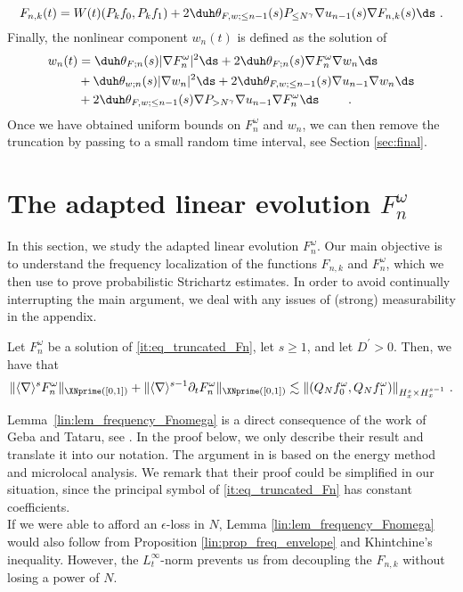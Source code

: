 \documentclass[11pt]{article}
\begin{document}
\begin{equation}
F_{n,k}(t)= W(t) (P_k  f_0, P_k f_1) + 2 \duh \theta_{F,w;\leq n-1}(s) P_{\leq N^\gamma} \nabla u_{n-1}(s) \nabla F_{n,k}(s) \ds~. \label{it:eq_truncated_Fnk}
\end{equation}
Finally, the nonlinear component \( w_{n}(t) \) is defined as the solution of 
\begin{align}
w_n(t) &= \duh  \theta_{F;n}(s) |\nabla F_n^\omega|^2\ds  
		+ 2 \duh \theta_{F;n}(s) \nabla F_n^\omega \nabla w_n \ds   \notag\\
		&+ \duh \theta_{w;n}(s) |\nabla w_n|^2\ds\label{it:eq_truncated_wn}  
		+ 2 \duh \theta_{F,w;\leq n-1}(s) \nabla u_{n-1} \nabla w_n \ds   \\
		&+ 2 \duh \theta_{F,w;\leq n-1}(s) \nabla P_{>N^\gamma} \nabla u_{n-1} \nabla F_n^\omega \ds \qquad~.   \notag
\end{align}
Once we have obtained uniform bounds on \(F_n^\omega \) and \( w_n \), we can then remove the truncation by passing to a small random time interval, see Section \ref{sec:final}.

\section{The adapted linear evolution \(F_n^\omega\)}\label{sec:lin}

In this section, we study the adapted linear evolution \( F_n^\omega \). Our main objective is to understand the frequency localization of the functions \( F_{n,k} \) and \( F_n^\omega \), which we then use to prove probabilistic Strichartz estimates. In order to avoid continually interrupting the main argument, we deal with any issues of (strong) measurability in the appendix.

\begin{lem} \label{lin:lem_frequency_Fnomega}
Let \( F_n^\omega \) be a solution of \eqref{it:eq_truncated_Fn}, let \( s \geq 1 \), and let \( D^\prime >0\). Then, we have that
\begin{equation}\label{lin:eq_frequency_Fnomega}
\| \langle \nabla \rangle^s F_n^\omega \|_{\XNprime([0,1])} + \| \langle \nabla \rangle^{s-1} \partial_t F_n^\omega \|_{\XNprime([0,1])} \lesssim \| (Q_N f_0^\omega, Q_N f_1^\omega ) \|_{H_x^s\times H_x^{s-1}} ~. 
\end{equation}
\end{lem}
\mbox{Lemma  \ref{lin:lem_frequency_Fnomega}} is a direct consequence of the work of Geba and Tataru, see \cite[Proposition 3.1]{TG05}. In the proof below, we only describe their result and translate it into our notation. The argument in \cite{TG05} is based on the energy method and microlocal analysis. We remark that their proof could be simplified in our situation, since the principal symbol of \eqref{it:eq_truncated_Fn} has constant coefficients. \\
If we were able to afford an \(\epsilon\)-loss in \( N\), Lemma \ref{lin:lem_frequency_Fnomega} would also follow from Proposition \ref{lin:prop_freq_envelope} and Khintchine's inequality. However, the \( L_t^\infty\)-norm prevents us from decoupling the \( F_{n,k} \) without losing a power of \( N \).
\end{document}
